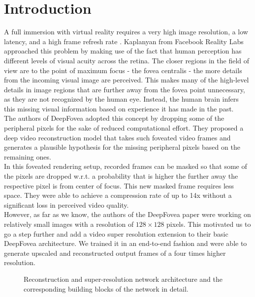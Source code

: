 \documentclass[10pt,twocolumn,letterpaper]{article}
\begin{document}
\section{Introduction} \label{sec:introduction}
A full immersion with virtual reality requires a very high image resolution, a low latency, and a high frame refresh rate \cite{deepfovea}. Kaplanyan \etal \cite{deepfovea} from Facebook Reality Labs approached this problem by making use of the fact that human perception has different levels of visual acuity across the retina. The closer regions in the field of view are to the point of maximum focus - the fovea centralis - the more details from the incoming visual image are perceived. This makes many of the high-level details in image regions that are further away from the fovea point unnecessary, as they are not recognized by the human eye. Instead, the human brain infers this missing visual information based on experience it has made in the past.\\
The authors of DeepFovea \cite{deepfovea} adopted this concept by dropping some of the peripheral pixels for the sake of reduced computational effort. They proposed a deep video reconstruction model that takes such foveated video frames and generates a plausible hypothesis for the missing peripheral pixels based on the remaining ones.\\
In this foveated rendering setup, recorded frames can be masked so that some of the pixels are dropped w.r.t. a probability that is higher the further away the respective pixel is from center of focus. This new masked frame requires less space. They were able to achieve a compression rate of up to 14x without a significant loss in perceived video quality.\\
However, as far as we know, the authors of the DeepFovea paper were working on relatively small images with a resolution of $128\times 128$ pixels. This motivated us to go a step further and add a video super resolution extension to their basic DeepFovea architecture. We trained it in an end-to-end fashion and were able to generate upscaled and reconstructed output frames of a four times higher resolution.\\

\begin{figure}[htbp!]
    \centering
    
    \caption{Reconstruction and super-resolution network architecture and the corresponding building blocks of the network in detail.}
    \label{fig:reconstructionnetwork}
\end{figure}
\end{document}
